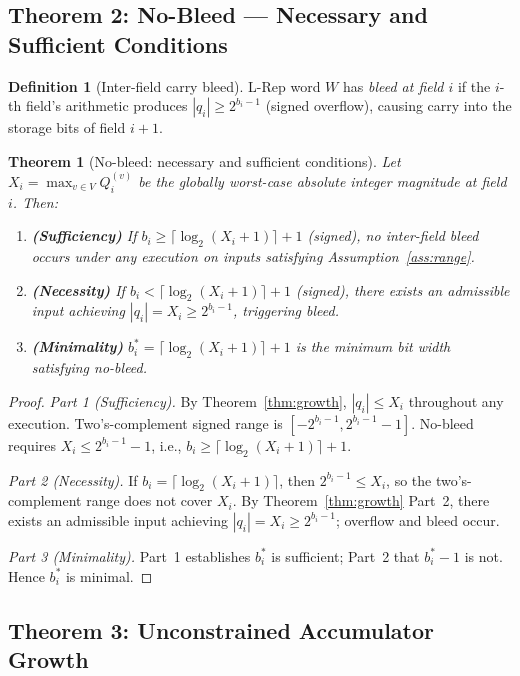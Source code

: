 \documentclass[11pt,a4paper]{article}
\theoremstyle{definition}
\newtheorem{definition}{Definition}[section]
\theoremstyle{plain}
\newtheorem{theorem}{Theorem}[section]
\theoremstyle{remark}
\begin{document}
\subsection{Theorem 2: No-Bleed --- Necessary and Sufficient Conditions}
\label{sec:nobleed}

\begin{definition}[Inter-field carry bleed]
L-Rep word $W$ has \emph{bleed at field $i$} if the $i$-th field's
arithmetic produces $|q_i|\ge2^{b_i-1}$ (signed overflow), causing
carry into the storage bits of field $i+1$.
\end{definition}

\begin{theorem}[No-bleed: necessary and sufficient conditions]
\label{thm:nobleed}
Let $X_i=\max_{v\in V}Q_i^{(v)}$ be the globally worst-case absolute
integer magnitude at field $i$.
Then:
\begin{enumerate}
  \item \textbf{(Sufficiency)} If $b_i\ge\lceil\log_2(X_i+1)\rceil+1$
        (signed), no inter-field bleed occurs under any execution on
        inputs satisfying Assumption~\ref{ass:range}.
  \item \textbf{(Necessity)} If $b_i<\lceil\log_2(X_i+1)\rceil+1$
        (signed), there exists an admissible input achieving $|q_i|=X_i\ge2^{b_i-1}$,
        triggering bleed.
  \item \textbf{(Minimality)} $b_i^*=\lceil\log_2(X_i+1)\rceil+1$ is the
        minimum bit width satisfying no-bleed.
\end{enumerate}
\end{theorem}

\begin{proof}
\textit{Part 1 (Sufficiency).}
By Theorem~\ref{thm:growth}, $|q_i|\le X_i$ throughout any execution.
Two's-complement signed range is $[-2^{b_i-1},2^{b_i-1}-1]$.
No-bleed requires $X_i\le2^{b_i-1}-1$, i.e., $b_i\ge\lceil\log_2(X_i+1)\rceil+1$.

\textit{Part 2 (Necessity).}
If $b_i=\lceil\log_2(X_i+1)\rceil$, then $2^{b_i-1}\le X_i$, so the
two's-complement range does not cover $X_i$.
By Theorem~\ref{thm:growth} Part~2, there exists an admissible input
achieving $|q_i|=X_i\ge2^{b_i-1}$; overflow and bleed occur.

\textit{Part 3 (Minimality).}
Part~1 establishes $b_i^*$ is sufficient; Part~2 that $b_i^*-1$ is not.
Hence $b_i^*$ is minimal.
\end{proof}

\subsection{Theorem 3: Unconstrained Accumulator Growth}
\label{sec:growth}
\end{document}
